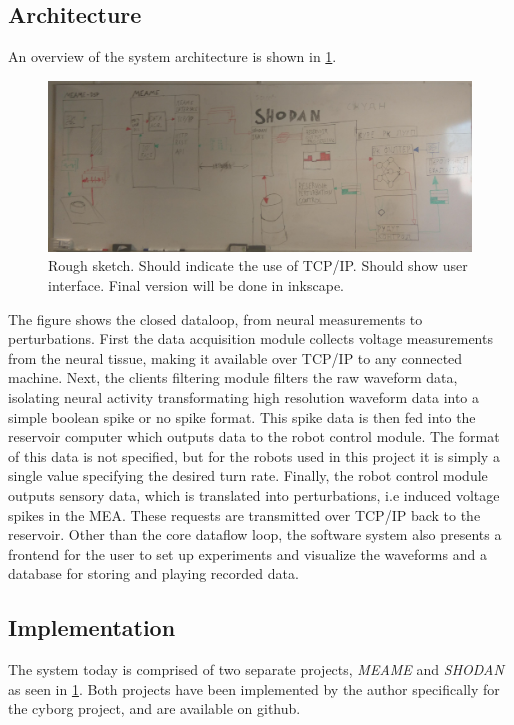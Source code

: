 \subsection{Architecture}
An overview of the system architecture is shown in \ref{figOverview}.
\begin{figure}[h!]
  \centering
  \includegraphics[width=1\textwidth]{fig/wb/system_overview.jpg}
  \caption{Rough sketch.
    Should indicate the use of TCP/IP.
    Should show user interface.
    Final version will be done in inkscape.
  }
  \label{figOverview}
\end{figure}
The figure shows the closed dataloop, from neural measurements to perturbations.
First the data acquisition module collects voltage measurements from the neural
tissue, making it available over TCP/IP to any connected machine.
%
Next, the clients filtering module filters the raw waveform data, isolating
neural activity transformating high resolution waveform data into a simple
boolean spike or no spike format.
%
This spike data is then fed into the reservoir computer which outputs data to
the robot control module.
The format of this data is not specified, but for the robots used in this
project it is simply a single value specifying the desired turn rate.
%
Finally, the robot control module outputs sensory data, which is translated into
perturbations, i.e induced voltage spikes in the MEA.
These requests are transmitted over TCP/IP back to the reservoir.
%
Other than the core dataflow loop, the software system also presents a frontend
for the user to set up experiments and visualize the waveforms and a database
for storing and playing recorded data.
\subsection{Implementation}
The system today is comprised of two separate projects, \emph{MEAME} and
\emph{SHODAN} as seen in \ref{figOverview}.
Both projects have been implemented by the author specifically for the cyborg
project, and are available on github.
%
%
